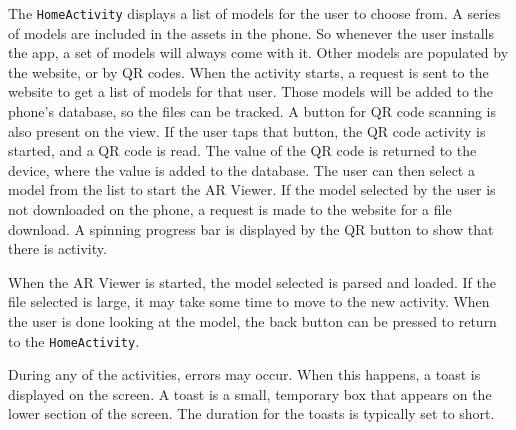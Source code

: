             The \texttt{HomeActivity} displays a list of models for the user to choose from.  A series of models are included in the assets in the phone.  So whenever the user installs the app, a set of models will always come with it.  Other models are populated by the website, or by QR codes.  When the activity starts, a request is sent to the website to get a list of models for that user.  Those models will be added to the phone's database, so the files can be tracked.  A button for QR code scanning is also present on the view.  If the user taps that button, the QR code activity is started, and a QR code is read.  The value of the QR code is returned to the device, where the value is added to the database.  The user can then select a model from the list to start the AR Viewer.  If the model selected by the user is not downloaded on the phone, a request is made to the website for a file download.  A spinning progress bar is displayed by the QR button to show that there is activity.

            When the AR Viewer is started, the model selected is parsed and loaded.  If the file selected is large, it may take some time to move to the new activity.  When the user is done looking at the model, the back button can be pressed to return to the \texttt{HomeActivity}.
            
            During any of the activities, errors may occur.  When this happens, a toast is displayed on the screen.  A toast is a small, temporary box that appears on the lower section of the screen.  The duration for the toasts is typically set to short.

